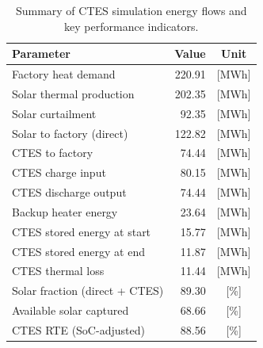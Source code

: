 \renewcommand{\arraystretch}{1.2}
\begin{table}[h]
\centering
\begin{tabular}{l|r c}
\hline
Parameter & Value & Unit \\
\hline
Factory heat demand & 220.91 & [MWh] \\
Solar thermal production & 202.35 & [MWh] \\
Solar curtailment & 92.35 & [MWh] \\
Solar to factory (direct) & 122.82 & [MWh] \\
CTES to factory & 74.44 & [MWh] \\
CTES charge input & 80.15 & [MWh] \\
CTES discharge output & 74.44 & [MWh] \\
Backup heater energy & 23.64 & [MWh] \\
CTES stored energy at start & 15.77 & [MWh] \\
CTES stored energy at end & 11.87 & [MWh] \\
CTES thermal loss & 11.44 & [MWh] \\
\hline
Solar fraction (direct + CTES) & 89.30 & [\%] \\
Available solar captured & 68.66 & [\%] \\
CTES RTE (SoC-adjusted) & 88.56 & [\%] \\
\hline
\end{tabular}
\caption{Summary of CTES simulation energy flows and key performance indicators.}
\label{tab:ctes-simulation-summary}
\end{table}
